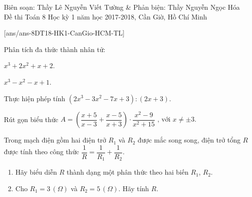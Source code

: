 
\begin{name}
{Biên soạn: Thầy Lê Nguyễn Viết Tường \& Phản biện: Thầy Nguyễn Ngọc Hóa}
{Đề thi Toán 8 Học kỳ 1 năm học 2017-2018, Cần Giờ, Hồ Chí Minh}
\end{name}
\setcounter{bt}{0}
[ans/ans-8DT18-HK1-CanGio-HCM-TL]
\begin{bt}%
Phân tích đa thức thành nhân tử:
\begin{listEX}[2]
\item $x^3+2x^2+x+2$.
\item $x^3-x^2-x+1$.
\end{listEX}
\end{bt}
\begin{bt}%
Thực hiện phép tính $(2x^3-3x^2-7x+3):(2x+3).$
\end{bt}
\begin{bt}%
Rút gọn biểu thức $A=\left(\dfrac{x+5}{x-3}+\dfrac{x-5}{x+3}\right)\cdot \dfrac{x^2-9}{x^2+15	}\text{ , với }x\ne\pm3.$
\end{bt}
\begin{bt}%
Trong mạch điện gồm hai điện trở $R_1$ và $R_2$ được mắc song song, điện trở tổng $R$ được tính theo công thức $\dfrac{1}{R}=\dfrac{1}{R_1}+\dfrac{1}{R_2}$.
\begin{enumerate}
\item Hãy biểu diễn $R$ thành dạng một phân thức theo hai biến $R_1$, $R_2$.
\item Cho $R_1=3 \,(\Omega )$ và $R_2=5\,(\Omega)$. Hãy tính $R$.
\end{enumerate}
\end{bt}

